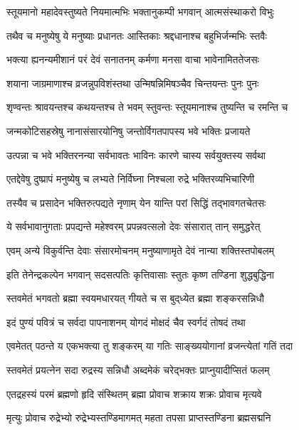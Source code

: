 \twolineshloka
{स्तूयमानो महादेवस्तुष्यते नियमात्मभिः}%
{भक्तानुकम्पी भगवान् आत्मसंस्थाकरो विभुः}%


\twolineshloka
{तथैव च मनुष्येषु ये मनुष्याः प्रधानतः}%
{आस्तिकाः श्रद्दधानाश्च बहुभिर्जन्मभिः स्तवैः}%


\twolineshloka
{भक्त्या ह्यनन्यमीशानं परं देवं सनातनम्}%
{कर्मणा मनसा वाचा भावेनामिततेजसः}%


\twolineshloka
{शयाना जाग्रमाणाश्च व्रजन्नुपविशंस्तथा}%
{उन्मिषन्निमिषञ्चैव चिन्तयन्तः पुनः पुनः}%

\twolineshloka
{शृण्वन्तः श्रावयन्तश्च कथयन्तश्च ते भवम्}%
{स्तुवन्तः स्तूयमानाश्च तुष्यन्ति च रमन्ति च}%


\twolineshloka
{जन्मकोटिसहस्रेषु नानासंसारयोनिषु}%
{जन्तोर्विगतपापस्य भवे भक्तिः प्रजायते}%


\twolineshloka
{उत्पन्ना च भवे भक्तिरनन्या सर्वभावतः}%
{भाविनः कारणे चास्य सर्वयुक्तस्य सर्वथा}%


\twolineshloka
{एतद्देवेषु दुष्प्रापं मनुष्येषु च लभ्यते}%
{निर्विघ्ना निश्चला रुद्रे भक्तिरव्यभिचारिणी}

\twolineshloka
{तस्यैव च प्रसादेन भक्तिरुत्पद्यते नृणाम्}%
{येन यान्ति परां सिद्धिं तद्भावगतचेतसः}%

\twolineshloka
{ये सर्वभावानुगताः प्रपद्यन्ते महेश्वरम्}%
{प्रपन्नवत्सलो देवः संसारात् तान् समुद्धरेत्}%

\twolineshloka
{एवम् अन्ये विकुर्वन्ति देवाः संसारमोचनम्}%
{मनुष्याणामृते देवं नान्या शक्तिस्तपोबलम्}%

\twolineshloka
{इति तेनेन्द्रकल्पेन भगवान् सदसत्पतिः}%
{कृत्तिवासाः स्तुतः कृष्ण तण्डिना शुद्धबुद्धिना}%

\twolineshloka
{स्तवमेतं  भगवतो ब्रह्मा स्वयमधारयत्}%
{गीयते च स बुद्‌ध्येत ब्रह्मा शङ्करसन्निधौ}%

\twolineshloka
{इदं पुण्यं पवित्रं च सर्वदा पापनाशनम्}%
{योगदं मोक्षदं चैव स्वर्गदं तोषदं तथा}%

\twolineshloka
{एवमेतत् पठन्ते य एकभक्त्या तु शङ्करम्}%
{या गतिः साङ्ख्ययोगानां व्रजन्त्येतां गतिं तदा}%

\twolineshloka
{स्तवमेतं प्रयत्नेन सदा रुद्रस्य सन्निधौ}%
{अब्दमेकं चरेद्भक्तः प्राप्नुयादीप्सितं फलम्}%

\twolineshloka
{एतद्रहस्यं परमं ब्रह्मणो हृदि संस्थितम्}%
{ब्रह्मा प्रोवाच शक्राय शक्रः प्रोवाच मृत्यवे}%

\twolineshloka
{मृत्युः प्रोवाच रुद्रेभ्यो रुद्रेभ्यस्तण्डिमागमत्}%
{महता तपसा प्राप्तस्तण्डिना ब्रह्मसद्मनि}%

